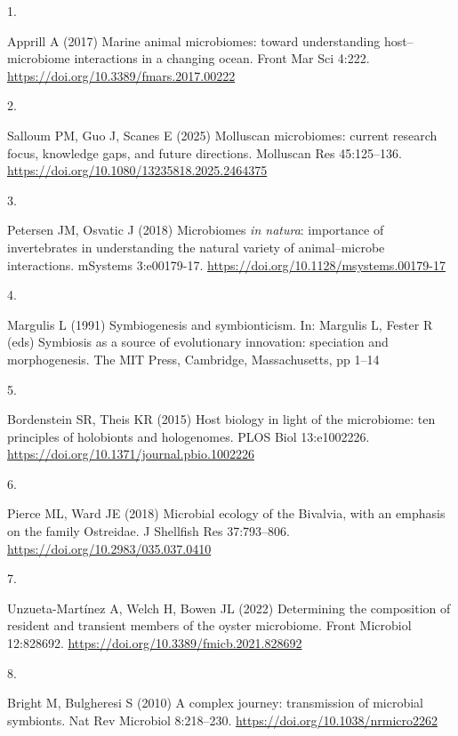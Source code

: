 \documentclass[
  12 pt,
]{article}
\newlength{\cslhangindent}
\newlength{\csllabelwidth}
\newenvironment{CSLReferences}[2] %
 {\begin{list}{}{%
  \setlength{\itemindent}{0pt}
  \setlength{\leftmargin}{0pt}
  \setlength{\parsep}{0pt}
  \ifodd #1
   \setlength{\leftmargin}{\cslhangindent}
   \setlength{\itemindent}{-1\cslhangindent}
  \fi
  \setlength{\itemsep}{#2\baselineskip}}}
 {\end{list}}
\newcommand{\CSLLeftMargin}[1]{\parbox[t]{\csllabelwidth}{\strut#1\strut}}
\newcommand{\CSLRightInline}[1]{\parbox[t]{\linewidth - \csllabelwidth}{\strut#1\strut}}
\begin{document}
\label{refs}
\begin{CSLReferences}{0}{0}
\CSLLeftMargin{1. }%
\CSLRightInline{Apprill A (2017) Marine animal microbiomes: toward understanding host--microbiome interactions in a changing ocean. Front Mar Sci 4:222. \url{https://doi.org/10.3389/fmars.2017.00222}}

\CSLLeftMargin{2. }%
\CSLRightInline{Salloum PM, Guo J, Scanes E (2025) Molluscan microbiomes: current research focus, knowledge gaps, and future directions. Molluscan Res 45:125--136. \url{https://doi.org/10.1080/13235818.2025.2464375}}

\CSLLeftMargin{3. }%
\CSLRightInline{Petersen JM, Osvatic J (2018) Microbiomes {{\emph{in natura}}}: importance of invertebrates in understanding the natural variety of animal--microbe interactions. mSystems 3:e00179-17. \url{https://doi.org/10.1128/msystems.00179-17}}

\CSLLeftMargin{4. }%
\CSLRightInline{Margulis L (1991) Symbiogenesis and symbionticism. In: Margulis L, Fester R (eds) Symbiosis as a source of evolutionary innovation: speciation and morphogenesis. The MIT Press, Cambridge, Massachusetts, pp 1--14}

\CSLLeftMargin{5. }%
\CSLRightInline{Bordenstein SR, Theis KR (2015) Host biology in light of the microbiome: ten principles of holobionts and hologenomes. PLOS Biol 13:e1002226. \url{https://doi.org/10.1371/journal.pbio.1002226}}

\CSLLeftMargin{6. }%
\CSLRightInline{Pierce ML, Ward JE (2018) Microbial ecology of the {Bivalvia}, with an emphasis on the family {Ostreidae}. J Shellfish Res 37:793--806. \url{https://doi.org/10.2983/035.037.0410}}

\CSLLeftMargin{7. }%
\CSLRightInline{Unzueta-Martínez A, Welch H, Bowen JL (2022) Determining the composition of resident and transient members of the oyster microbiome. Front Microbiol 12:828692. \url{https://doi.org/10.3389/fmicb.2021.828692}}

\CSLLeftMargin{8. }%
\CSLRightInline{Bright M, Bulgheresi S (2010) A complex journey: transmission of microbial symbionts. Nat Rev Microbiol 8:218--230. \url{https://doi.org/10.1038/nrmicro2262}}


\end{CSLReferences}
\end{document}

